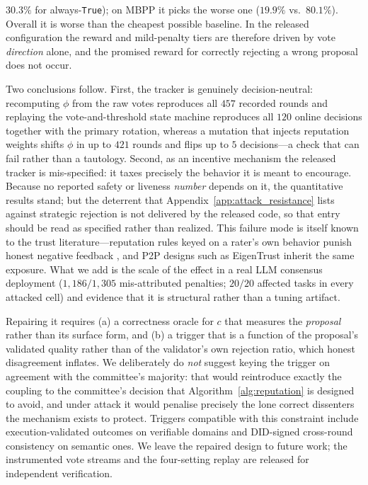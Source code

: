 \documentclass{article}
\begin{document}
$30.3\%$ for always-\texttt{True}); on MBPP it picks the worse one ($19.9\%$ vs.\ $80.1\%$). Overall it is worse than the cheapest possible baseline. In the released configuration the reward and mild-penalty tiers are therefore driven by vote \emph{direction} alone, and the promised reward for correctly rejecting a wrong proposal does not occur.

Two conclusions follow. First, the tracker is genuinely decision-neutral: recomputing $\phi$ from the raw votes reproduces all $457$ recorded rounds and replaying the vote-and-threshold state machine reproduces all $120$ online decisions together with the primary rotation, whereas a mutation that injects reputation weights shifts $\phi$ in up to $421$ rounds and flips up to $5$ decisions---a check that can fail rather than a tautology. Second, as an incentive mechanism the released tracker is mis-specified: it taxes precisely the behavior it is meant to encourage. Because no reported safety or liveness \emph{number} depends on it, the quantitative results stand; but the deterrent that Appendix~\ref{app:attack_resistance} lists against strategic rejection is not delivered by the released code, so that entry should be read as specified rather than realized. This failure mode is itself known to the trust literature---reputation rules keyed on a rater's own behavior punish honest negative feedback \citep{josang2002beta,josang2007survey}, and P2P designs such as EigenTrust \citep{kamvar2003eigentrust} inherit the same exposure. What we add is the scale of the effect in a real LLM consensus deployment ($1{,}186/1{,}305$ mis-attributed penalties; $20/20$ affected tasks in every attacked cell) and evidence that it is structural rather than a tuning artifact.

Repairing it requires (a) a correctness oracle for $c$ that measures the \emph{proposal} rather than its surface form, and (b) a trigger that is a function of the proposal's validated quality rather than of the validator's own rejection ratio, which honest disagreement inflates. We deliberately do \emph{not} suggest keying the trigger on agreement with the committee's majority: that would reintroduce exactly the coupling to the committee's decision that Algorithm~\ref{alg:reputation} is designed to avoid, and under attack it would penalise precisely the lone correct dissenters the mechanism exists to protect. Triggers compatible with this constraint include execution-validated outcomes on verifiable domains and DID-signed cross-round consistency on semantic ones. We leave the repaired design to future work; the instrumented vote streams and the four-setting replay are released for independent verification.
\end{document}
